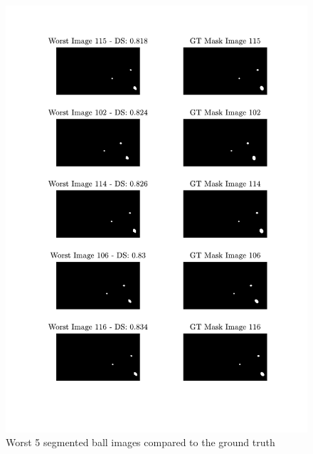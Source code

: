 \documentclass[conference]{IEEEtran}
\begin{document}
    \begin{figure}[htbp]
        \centering
        \includegraphics[width=\columnwidth]{figures/worst.pdf}
        \caption{Worst 5 segmented ball images compared to the ground truth\label{apx:worst}}
    \end{figure}
\end{document}
